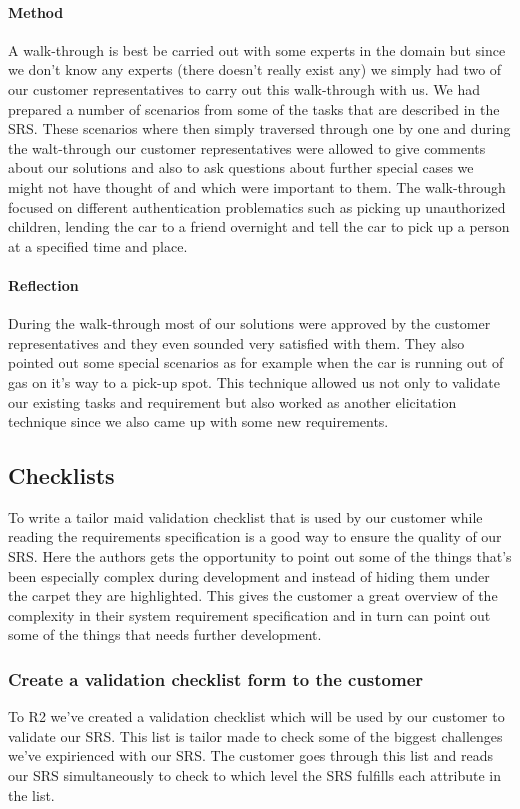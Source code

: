 \documentclass[10pt]{article}
\begin{document}
\paragraph{Method}
\hfill \break
A walk-through is best be carried out with some experts in the domain but since we don't know any experts (there doesn't really exist any) we simply had two of our customer representatives to carry out this walk-through with us.
We had prepared a number of scenarios from some of the tasks that are described in the SRS. These scenarios where then simply traversed through one by one and during the walt-through our customer representatives were allowed to give comments about our solutions and also to ask questions about further special cases we might not have thought of and which were important to them.
The walk-through focused on different authentication problematics such as picking up unauthorized children, lending the car to a friend overnight and tell the car to pick up a person at a specified time and place.
\paragraph{Reflection}
\hfill \break
During the walk-through most of our solutions were approved by the customer representatives and they even sounded very satisfied with them.
They also pointed out some special scenarios as for example when the car is running out of gas on it's way to a pick-up spot.
This technique allowed us not only to validate our existing tasks and requirement but also worked as another elicitation technique since we also came up with some new requirements.

\subsection{Checklists}
To write a tailor maid validation checklist that is used by our customer while reading the requirements specification is a good way to ensure the quality of our SRS. Here the authors gets the opportunity to point out some of the things that's been especially complex during development and instead of hiding them under the carpet they are highlighted. This gives the customer a great overview of the complexity in their system requirement specification and in turn can point out some of the things that needs further development.
\subsubsection{Create a validation checklist form to the customer}
To R2 we've created a validation checklist which will be used by our customer to validate our SRS. This list is tailor made to check some of the biggest challenges we've expirienced with our SRS. The customer goes through this list and reads our SRS simultaneously to check to which level the SRS fulfills each attribute in the list.
\end{document}
